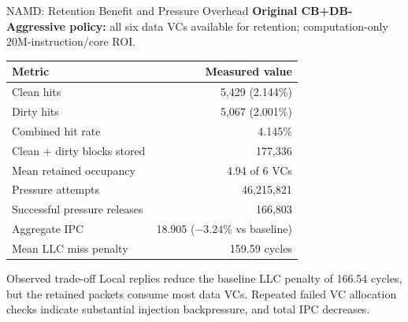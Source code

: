 \documentclass[aspectratio=169,11pt]{beamer}
\begin{document}
\begin{frame}{NAMD: Retention Benefit and Pressure Overhead}
  \small
  \textbf{Original CB+DB-Aggressive policy:} all six data VCs available for
  retention; computation-only 20M-instruction/core ROI.
  \vspace{0.15cm}

  \centering
  \begin{tabular}{@{}lr@{}}
    \toprule
    \textbf{Metric} & \textbf{Measured value} \\
    \midrule
    Clean hits & 5,429 (2.144\%) \\
    Dirty hits & 5,067 (2.001\%) \\
    Combined hit rate & 4.145\% \\
    Clean + dirty blocks stored & 177,336 \\
    Mean retained occupancy & 4.94 of 6 VCs \\
    Pressure attempts & 46,215,821 \\
    Successful pressure releases & 166,803 \\
    Aggregate IPC & 18.905 ($-3.24\%$ vs baseline) \\
    Mean LLC miss penalty & 159.59 cycles \\
    \bottomrule
  \end{tabular}

  \vspace{0.25cm}
  \begin{alertblock}{Observed trade-off}
    Local replies reduce the baseline LLC penalty of 166.54 cycles, but the
    retained packets consume most data VCs. Repeated failed VC allocation
    checks indicate substantial injection backpressure, and total IPC decreases.
  \end{alertblock}
\end{frame}
\end{document}
